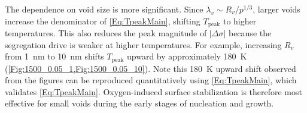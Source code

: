 \documentclass[preprint,12pt,sort&compress]{elsarticle}
\newcommand{\?}{\stackrel{?}{=}}
\begin{document}
The dependence on void size is more significant. Since $\lambda_v \sim R_v / p^{1/3}$, larger voids increase the denominator of \cref{Eq:TpeakMain}, shifting $T_\text{peak}$ to higher temperatures. This also reduces the peak magnitude of $|\Delta\sigma|$ because the segregation drive is weaker at higher temperatures. For example, increasing $R_v$ from 1~nm to 10~nm shifts $T_\text{peak}$ upward by approximately 180~K (\cref{Fig:1500_0.05_1,Fig:1500_0.05_10}). Note this 180~K upward shift observed from the figures can be reproduced quantitatively using \cref{Eq:TpeakMain}, which validates \cref{Eq:TpeakMain}. Oxygen-induced surface stabilization is therefore most effective for small voids during the early stages of nucleation and growth.

\end{document}
